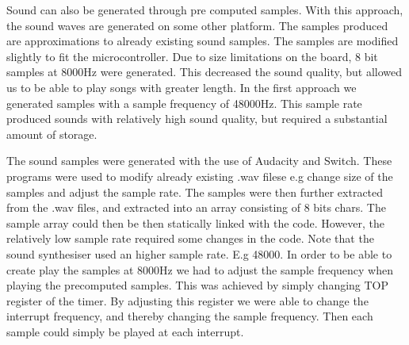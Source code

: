 
Sound can also be generated through pre computed samples. With this approach, the sound waves are generated on some other platform. The samples produced are approximations to already existing sound samples. The samples are modified slightly to fit the microcontroller. Due to size limitations on the board, 8 bit samples at 8000Hz were generated. This decreased the sound quality, but allowed us to be able to play songs with greater length. In the first approach we generated samples with a sample frequency of 48000Hz. This sample rate produced sounds with relatively high sound quality, but required a substantial amount of storage.

The sound samples were generated with the use of Audacity and Switch. These programs were used to modify already existing .wav filese e.g change size of the samples and adjust the sample rate. The samples were then further extracted from the .wav files, and extracted into an array consisting of 8 bits chars. The sample array could then be then statically linked with the code. However, the relatively low sample rate required some changes in the code. Note that the sound synthesiser used an higher sample rate. E.g 48000. In order to be able to create play the samples at 8000Hz we had to adjust the sample frequency when playing the precomputed samples. This was achieved by simply changing TOP register of the timer. By adjusting this register we were able to change the interrupt frequency, and thereby changing the sample frequency. Then each sample could simply be played at each interrupt.  



  











